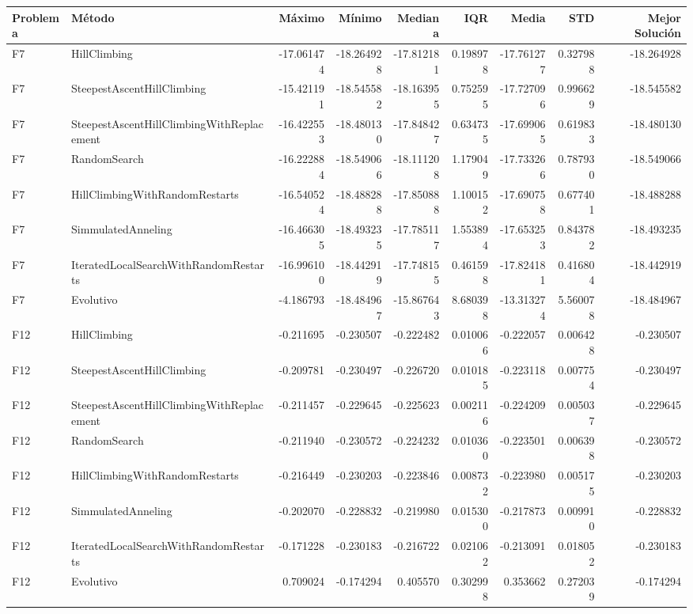 \begin{tabular}{llrrrrrrr}
\toprule
Problema & Método & Máximo & Mínimo & Mediana & IQR & Media & STD & Mejor Solución \\
\midrule
F7 & HillClimbing & -17.061474 & -18.264928 & -17.812181 & 0.198978 & -17.761277 & 0.327988 & -18.264928 \\
F7 & SteepestAscentHillClimbing & -15.421191 & -18.545582 & -18.163955 & 0.752595 & -17.727096 & 0.996629 & -18.545582 \\
F7 & SteepestAscentHillClimbingWithReplacement & -16.422553 & -18.480130 & -17.848427 & 0.634735 & -17.699065 & 0.619833 & -18.480130 \\
F7 & RandomSearch & -16.222884 & -18.549066 & -18.111208 & 1.179049 & -17.733266 & 0.787930 & -18.549066 \\
F7 & HillClimbingWithRandomRestarts & -16.540524 & -18.488288 & -17.850888 & 1.100152 & -17.690758 & 0.677401 & -18.488288 \\
F7 & SimmulatedAnneling & -16.466305 & -18.493235 & -17.785117 & 1.553894 & -17.653253 & 0.843782 & -18.493235 \\
F7 & IteratedLocalSearchWithRandomRestarts & -16.996100 & -18.442919 & -17.748155 & 0.461598 & -17.824181 & 0.416804 & -18.442919 \\
F7 & Evolutivo & -4.186793 & -18.484967 & -15.867643 & 8.680398 & -13.313274 & 5.560078 & -18.484967 \\
F12 & HillClimbing & -0.211695 & -0.230507 & -0.222482 & 0.010066 & -0.222057 & 0.006428 & -0.230507 \\
F12 & SteepestAscentHillClimbing & -0.209781 & -0.230497 & -0.226720 & 0.010185 & -0.223118 & 0.007754 & -0.230497 \\
F12 & SteepestAscentHillClimbingWithReplacement & -0.211457 & -0.229645 & -0.225623 & 0.002116 & -0.224209 & 0.005037 & -0.229645 \\
F12 & RandomSearch & -0.211940 & -0.230572 & -0.224232 & 0.010360 & -0.223501 & 0.006398 & -0.230572 \\
F12 & HillClimbingWithRandomRestarts & -0.216449 & -0.230203 & -0.223846 & 0.008732 & -0.223980 & 0.005175 & -0.230203 \\
F12 & SimmulatedAnneling & -0.202070 & -0.228832 & -0.219980 & 0.015300 & -0.217873 & 0.009910 & -0.228832 \\
F12 & IteratedLocalSearchWithRandomRestarts & -0.171228 & -0.230183 & -0.216722 & 0.021062 & -0.213091 & 0.018052 & -0.230183 \\
F12 & Evolutivo & 0.709024 & -0.174294 & 0.405570 & 0.302998 & 0.353662 & 0.272039 & -0.174294 \\

\end{tabular}
